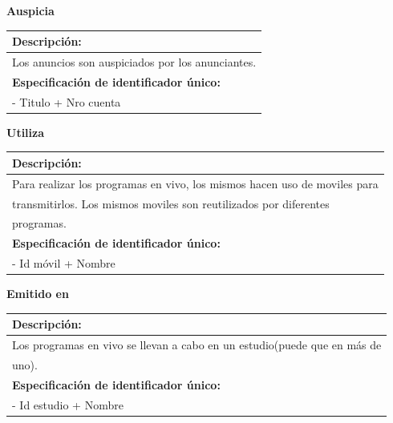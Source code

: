 \documentclass[a4paper,10pt]{article}
\begin{document}
    \begin{flushleft}
      \begin{large} \bf{Auspicia} \end{large}
    \end{flushleft}
      \begin{tabular}{| p{2cm} | p{9cm} |}
	\hline
	\multicolumn{2}{|l|}{\bf{Descripci\'on:}} \\
	\hline
	\multicolumn{2}{|l|}{Los anuncios son auspiciados por los anunciantes.} \\
	\hline	
	\multicolumn{2}{|l|}{\bf{Especificaci\'on de identificador \'unico:}} \\
	\hline
	\multicolumn{2}{|l|}{- Titulo + Nro cuenta} \\
	\hline
      \end{tabular}


    \begin{flushleft}
      \begin{large} \bf{Utiliza} \end{large}
    \end{flushleft}
      \begin{tabular}{| p{2cm} | p{9cm} |}
	\hline
	\multicolumn{2}{|l|}{\bf{Descripci\'on:}} \\
	\hline
	\multicolumn{2}{|l|}{Para realizar los programas en vivo, los mismos hacen uso de moviles para} \\
	\multicolumn{2}{|l|}{transmitirlos. Los mismos moviles son reutilizados por diferentes} \\	
	\multicolumn{2}{|l|}{programas.} \\
	\hline	
	\multicolumn{2}{|l|}{\bf{Especificaci\'on de identificador \'unico:}} \\
	\hline
	\multicolumn{2}{|l|}{- Id m\'ovil + Nombre} \\
	\hline
      \end{tabular}


    \begin{flushleft}
      \begin{large} \bf{Emitido en} \end{large}
    \end{flushleft}
      \begin{tabular}{| p{2cm} | p{9cm} |}
	\hline
	\multicolumn{2}{|l|}{\bf{Descripci\'on:}} \\
	\hline
	\multicolumn{2}{|l|}{Los programas en vivo se llevan a cabo en un estudio(puede que en m\'as de} \\
	\multicolumn{2}{|l|}{uno).} \\	
	\hline
	\multicolumn{2}{|l|}{\bf{Especificaci\'on de identificador \'unico:}} \\
	\hline
	\multicolumn{2}{|l|}{- Id estudio + Nombre} \\
	\hline
      \end{tabular}
      
\end{document}
